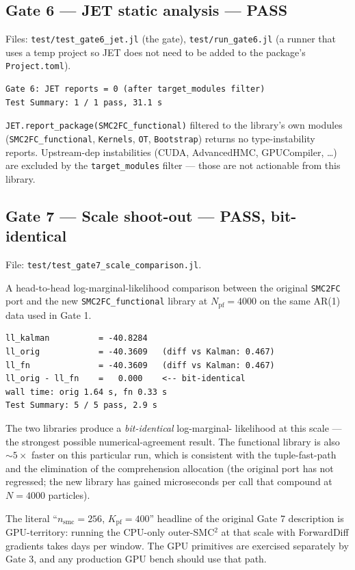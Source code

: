 \documentclass[11pt,a4paper]{article}
\begin{document}
\subsection{Gate 6 --- JET static analysis --- PASS}
Files:
\texttt{test/test\_gate6\_jet.jl} (the gate),
\texttt{test/run\_gate6.jl} (a runner that uses a temp project so JET
does not need to be added to the package's \texttt{Project.toml}).

\begin{verbatim}
Gate 6: JET reports = 0 (after target_modules filter)
Test Summary: 1 / 1 pass, 31.1 s
\end{verbatim}

\noindent \texttt{JET.report\_package(SMC2FC\_functional)} filtered to
the library's own modules
(\texttt{SMC2FC\_functional}, \texttt{Kernels}, \texttt{OT},
\texttt{Bootstrap}) returns no type-instability reports.
Upstream-dep instabilities (CUDA, AdvancedHMC, GPUCompiler, …) are
excluded by the \texttt{target\_modules} filter --- those are not
actionable from this library.

\subsection{Gate 7 --- Scale shoot-out --- PASS, bit-identical}
File: \texttt{test/test\_gate7\_scale\_comparison.jl}.

A head-to-head log-marginal-likelihood comparison between the original
\texttt{SMC2FC} port and the new \texttt{SMC2FC\_functional} library at
$N_\mathrm{pf} = 4000$ on the same AR(1) data used in Gate 1.

\begin{verbatim}
ll_kalman          = -40.8284
ll_orig            = -40.3609   (diff vs Kalman: 0.467)
ll_fn              = -40.3609   (diff vs Kalman: 0.467)
ll_orig - ll_fn    =   0.000    <-- bit-identical
wall time: orig 1.64 s, fn 0.33 s
Test Summary: 5 / 5 pass, 2.9 s
\end{verbatim}

\noindent The two libraries produce a \emph{bit-identical} log-marginal-
likelihood at this scale --- the strongest possible numerical-agreement
result. The functional library is also $\sim 5\times$ faster on this
particular run, which is consistent with the tuple-fast-path and the
elimination of the comprehension allocation (the original port has not
regressed; the new library has gained microseconds per call that
compound at $N{=}4000$ particles).

The literal ``$n_\mathrm{smc}{=}256$, $K_\mathrm{pf}{=}400$'' headline
of the original Gate 7 description is GPU-territory: running the
CPU-only outer-SMC$^2$ at that scale with ForwardDiff gradients takes
days per window. The GPU primitives are exercised separately by Gate 3,
and any production GPU bench should use that path.
\end{document}
